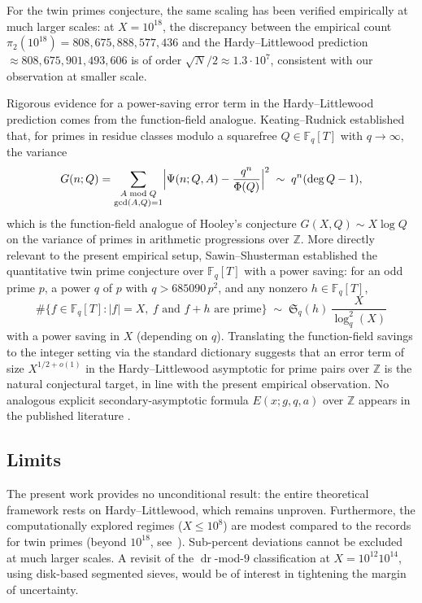 \documentclass[11pt]{amsart}
\theoremstyle{plain}
\theoremstyle{definition}
\theoremstyle{remark}
\DeclareMathOperator{\dr}{dr}
\begin{document}
For the twin primes conjecture, the same scaling has been verified
empirically at much larger scales: at $X = 10^{18}$, the discrepancy
between the empirical count $\pi_2(10^{18}) = 808{,}675{,}888{,}577{,}436$
and the Hardy--Littlewood prediction $\approx 808{,}675{,}901{,}493{,}606$
is of order $\sqrt{N}/2 \approx 1.3 \cdot 10^7$, consistent with our
observation at smaller scale.

Rigorous evidence for a power-saving error term in the
Hardy--Littlewood prediction comes from the function-field analogue.
Keating--Rudnick \cite{KR14} established that, for primes in residue
classes modulo a squarefree $Q \in \mathbb{F}_q[T]$ with $q \to \infty$,
the variance
\[
  G(n; Q) = \sum_{\substack{A \bmod Q \\ \gcd(A,Q)=1}}
  \Bigl| \Psi(n; Q, A) - \frac{q^n}{\Phi(Q)} \Bigr|^2
  \;\sim\; q^n (\deg Q - 1),
\]
which is the function-field analogue of Hooley's conjecture
$G(X, Q) \sim X \log Q$ on the variance of primes in arithmetic
progressions over $\mathbb{Z}$. More directly relevant to the
present empirical setup, Sawin--Shusterman \cite[Theorem 1.1]{SS22}
established the quantitative twin prime conjecture over
$\mathbb{F}_q[T]$ with a power saving: for an odd prime $p$, a power
$q$ of $p$ with $q > 685090\, p^2$, and any nonzero $h \in \mathbb{F}_q[T]$,
\[
  \#\{f \in \mathbb{F}_q[T] : |f| = X,\ f \text{ and } f+h \text{ are prime}\}
  \;\sim\; \mathfrak{S}_q(h) \, \frac{X}{\log_q^2(X)}
\]
with a power saving in $X$ (depending on $q$). Translating the
function-field savings to the integer setting via the standard
dictionary suggests that an error term of size $X^{1/2 + o(1)}$ in
the Hardy--Littlewood asymptotic for prime pairs over $\mathbb{Z}$
is the natural conjectural target, in line with the present
empirical observation. No analogous explicit secondary-asymptotic
formula $E(x; g, q, a)$ over $\mathbb{Z}$ appears in the published
literature \cite{MO_question}.

\subsection{Limits}

The present work provides no unconditional result: the entire
theoretical framework rests on Hardy--Littlewood, which remains
unproven. Furthermore, the computationally explored regimes
($X \le 10^8$) are modest compared to the records for twin primes
(beyond $10^{18}$, see~\cite{Nicely11}). Sub-percent deviations cannot
be excluded at much larger scales. A revisit of the $\dr$-mod-$9$
classification at $X = 10^{12}$\textendash$10^{14}$, using
disk-based segmented sieves, would be of interest in tightening the
margin of uncertainty.
\end{document}
